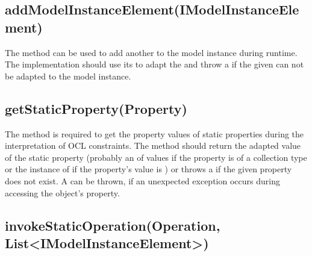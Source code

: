 \subsection{addModelInstanceElement(IModelInstanceElement)}
\label{sect:modelInstanceTypeAdaptation:addIMIElement}

The method  can be used to 
add another  to the model instance during runtime. The
implementation should use its  to adapt the 
 and throw a  if the given 
 can not be adapted to the model instance.


\subsection{getStaticProperty(Property)}

The method  is required to get the property 
values of static properties during the interpretation of OCL constraints. The
method should return the adapted value of the static property (probably an
 of values if the property is of a collection
type or the instance of  if the property's value is
) or throws a  if the given property
does not exist. A  can be thrown, if an unexpected
exception occurs during accessing the object's property.


\subsection{invokeStaticOperation(Operation, List<IModelInstanceElement>)}
			
